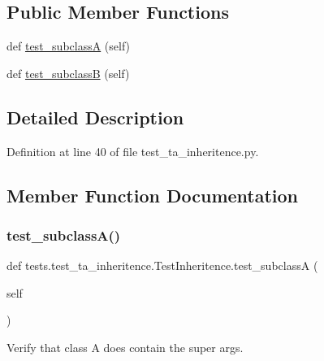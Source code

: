 \subsection*{Public Member Functions}
\begin{DoxyCompactItemize}
\item 
def \hyperlink{classtests_1_1test__ta__inheritence_1_1TestInheritence_acf9dc743befc9912294b89b31f393846}{test\+\_\+subclassA} (self)
\item 
def \hyperlink{classtests_1_1test__ta__inheritence_1_1TestInheritence_a3bed049c4393b8c6c8a9afbe550f7893}{test\+\_\+subclassB} (self)
\end{DoxyCompactItemize}


\subsection{Detailed Description}


Definition at line 40 of file test\+\_\+ta\+\_\+inheritence.\+py.



\subsection{Member Function Documentation}
\mbox{\label{classtests_1_1test__ta__inheritence_1_1TestInheritence_acf9dc743befc9912294b89b31f393846}} 
\subsubsection{\texorpdfstring{test\+\_\+subclass\+A()}{test\_subclassA()}}
{\footnotesize\ttfamily def tests.\+test\+\_\+ta\+\_\+inheritence.\+Test\+Inheritence.\+test\+\_\+subclassA (\begin{DoxyParamCaption}\item[{}]{self }\end{DoxyParamCaption})}

\begin{DoxyVerb}Verify that class A does contain the super args.\end{DoxyVerb}
 

